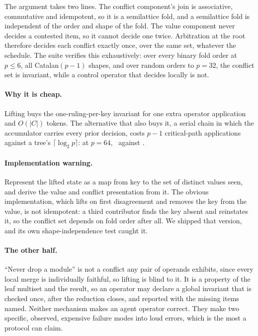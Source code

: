 \documentclass[sigconf,nonacm]{acmart}
\begin{document}
\noindent The argument takes two lines. The conflict component's join is
associative, commutative and idempotent, so it is a semilattice fold, and a
semilattice fold is independent of the order and shape of the fold. The value
component never decides a contested item, so it cannot decide one twice.
Arbitration at the root therefore decides each conflict exactly once, over the
same set, whatever the schedule. The suite verifies this exhaustively: over every
binary fold order at $p \le 6$, all Catalan$(p-1)$ shapes, and over random orders
to $p = 32$, the conflict set is invariant, while a control operator that decides
locally is not.

\paragraph{Why it is cheap.} Lifting buys the one-ruling-per-key invariant for
one extra operator application and $O(|C|)$ tokens. The alternative that also
buys it, a serial chain in which the accumulator carries every prior decision,
costs $p{-}1$ critical-path applications against a tree's $\lceil\log_2
p\rceil$: at $p=64$, \flatCritical\ against \treeCritical.

\paragraph{Implementation warning.} Represent the lifted state as a map from
key to the set of distinct values seen, and derive the value and conflict
presentation from it. The obvious implementation, which lifts on first
disagreement and removes the key from the value, is not idempotent: a third
contributor finds the key absent and reinstates it, so the conflict set depends
on fold order after all. We shipped that version, and its own shape-independence
test caught it.

\paragraph{The other half.} ``Never drop a module'' is not a conflict any pair
of operands exhibits, since every local merge is individually faithful, so
lifting is blind to it. It is a property of the leaf multiset and the result, so
an operator may declare a global invariant that is checked once, after the
reduction closes, and reported with the missing items named. Neither mechanism
makes an agent operator correct. They make two specific, observed, expensive
failure modes into loud errors, which is the most a protocol can claim.
\end{document}
